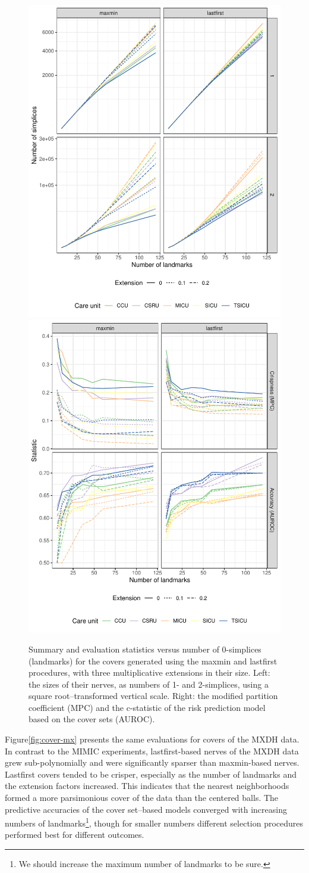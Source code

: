 \documentclass[
]{article}
\begin{document}
\begin{figure}
\includegraphics[width=.5\textwidth]{../figures/cover-simplices}
\includegraphics[width=.5\textwidth]{../figures/cover-evaluate}
\caption{
Summary and evaluation statistics versus number of 0-simplices (landmarks) for the covers generated using the maxmin and lastfirst procedures, with three multiplicative extensions in their size.
Left: the sizes of their nerves, as numbers of 1- and 2-simplices, using a square root--transformed vertical scale.
Right: the modified partition coefficient (MPC) and the c-statistic of the risk prediction model based on the cover sets (AUROC).
\label{fig:cover-mimic}
}
\end{figure}

Figure\nbs\ref{fig:cover-mx} presents the same evaluations for covers of
the MXDH data. In contrast to the MIMIC experiments, lastfirst-based
nerves of the MXDH data grew sub-polynomially and were significantly
sparser than maxmin-based nerves. Lastfirst covers tended to be crisper,
especially as the number of landmarks and the extension factors
increased. This indicates that the nearest neighborhoods formed a more
parsimonious cover of the data than the centered balls. The predictive
accuracies of the cover set--based models converged with increasing
numbers of landmarks\footnote{We should increase the maximum number of
  landmarks to be sure.}, though for smaller numbers different selection
procedures performed best for different outcomes.
\end{document}
